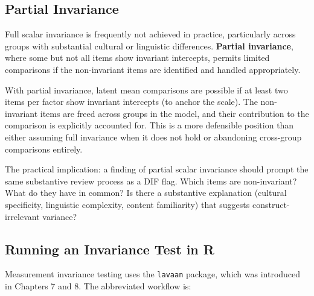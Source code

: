 \documentclass[
  11pt,
  letterpaper,
]{scrbook}
\begin{document}
\subsection{Partial Invariance}\label{partial-invariance}

Full scalar invariance is frequently not achieved in practice,
particularly across groups with substantial cultural or linguistic
differences. \textbf{Partial invariance}, where some but not all items
show invariant intercepts, permits limited comparisons if the
non-invariant items are identified and handled appropriately.

With partial invariance, latent mean comparisons are possible if at
least two items per factor show invariant intercepts (to anchor the
scale). The non-invariant items are freed across groups in the model,
and their contribution to the comparison is explicitly accounted for.
This is a more defensible position than either assuming full invariance
when it does not hold or abandoning cross-group comparisons entirely.

The practical implication: a finding of partial scalar invariance should
prompt the same substantive review process as a DIF flag. Which items
are non-invariant? What do they have in common? Is there a substantive
explanation (cultural specificity, linguistic complexity, content
familiarity) that suggests construct-irrelevant variance?

\subsection{Running an Invariance Test in
R}\label{running-an-invariance-test-in-r}

Measurement invariance testing uses the \texttt{lavaan} package, which
was introduced in Chapters 7 and 8. The abbreviated workflow is:
\end{document}
